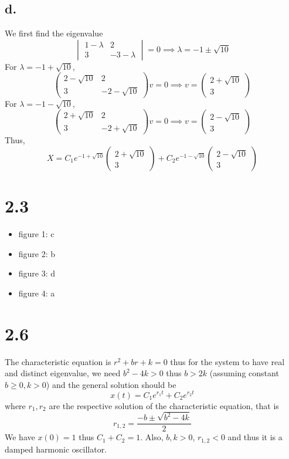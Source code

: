 \documentclass[11pt]{article}
\theoremstyle{mystyle}
\theoremstyle{definition}
\begin{document}
\subsection*{d.}
We first find the eigenvalue 
\[
  \begin{vmatrix}
    1 - \lambda & 2 \\
    3 & -3 - \lambda
  \end{vmatrix}
  = 0 \implies \lambda = - 1 \pm \sqrt{10} 
\]
For $\lambda = -1 + \sqrt{10}$, 
\[
  \begin{pmatrix}
    2 - \sqrt{10} & 2 \\
    3 & -2 - \sqrt{10}
  \end{pmatrix}
  v
  = 0 \implies
  v = 
  \begin{pmatrix}
    2 + \sqrt{10} \\
    3
  \end{pmatrix}
\]
For $\lambda = -1 - \sqrt{10}$, 
\[
  \begin{pmatrix}
    2 + \sqrt{10} & 2 \\
    3 & -2 + \sqrt{10}
  \end{pmatrix}
  v
  = 0 \implies
  v = 
  \begin{pmatrix}
    2 - \sqrt{10} \\
    3
  \end{pmatrix}
\]
Thus, 
\[
  X = C_1e^{-1 + \sqrt{10}} 
  \begin{pmatrix}
    2 + \sqrt{10} \\
    3
  \end{pmatrix}
  + C_2 e^{-1 - \sqrt{10}} 
  \begin{pmatrix}
    2 - \sqrt{10} \\
    3
  \end{pmatrix}
\]
\pagebreak
\section*{2.3}

\begin{itemize}
  \item figure 1: c \\
  \item figure 2: b \\
  \item figure 3: d \\
  \item figure 4: a
\end{itemize}
\pagebreak
\section*{2.6}
The characteristic equation is $r^2 + br + k = 0$ thus for the system to have real and distinct eigenvalue, we need $b^2 -4k > 0$ thus $b > 2k$ (assuming constant $b \ge 0, k > 0$) and the general solution should be 
\[
  x(t) = C_1 e^{r_1 t} + C_2 e^{r_2 t}
\]
where $r_1, r_2$ are the respective solution of the characteristic equation, that is 
\[
  r_{1,2} = \displaystyle\frac{-b \pm \sqrt{b^2-4k}}{2} 
\]
We have $x(0) = 1$ thus $C_1 + C_2 = 1$. Also, $b,k>0$, $r_{1,2} < 0$ and thus it is a damped harmonic oscillator. 
\pagebreak
\end{document}
